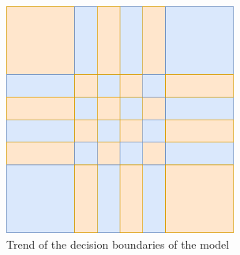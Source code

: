 \documentclass[compsoc]{IEEEtran}
\begin{document}
\begin{figure}[ht!]
\centering                                                                        
\includegraphics[width=3in]{../images/trend.png}
\captionsetup{justification=centering}                                                                                                                                   
\caption{Trend of the decision boundaries of the model}
\label{fig:trend}                                                                                                                                                           
\end{figure}
\end{document}
